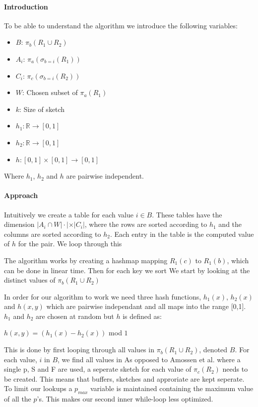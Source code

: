 \documentclass[a4paper,11pt]{article}
\begin{document}
\paragraph{Introduction}
To be able to understand the algorithm we introduce the following variables:

\begin{itemize}
  \item $B$: $\pi_{b}(R_1 \cup R_2)$
  \item $A_i$: $\pi_{a}(\sigma_{b=i}(R_1))$
  \item $C_i$: $\pi_{c}(\sigma_{b=i}(R_2))$
  \item $W$: Chosen subset of $\pi_{a}(R_1)$
  \item $k$: Size of sketch
  \item $h_1 : \mathbb{R} \rightarrow [0,1]$
  \item $h_2 : \mathbb{R} \rightarrow [0,1]$
  \item $h : [0,1] \times [0,1] \rightarrow [0,1]$
\end{itemize}
Where $h_1$, $h_2$ and $h$ are pairwise independent.

\paragraph{Approach}
Intuitively we create a table for each value $i \in B$. These tables have the dimension $|A_i\cap W|\cdot | \times |C_i|$, where the rows are sorted according to $h_1$ and the columns are sorted according to $h_2$. Each entry in the table is the computed value of $h$ for the pair. We loop through this 

The algorithm works by creating a hashmap mapping $R_1(c)$ to $R_1(b)$, which can be done in linear time. Then for each key we sort
We start by looking at the distinct values of $\pi_{b}(R_1 \cup R_2)$

In order for our algorithm to work we need three hash functions, $h_1(x)$, $h_2(x)$ and $h(x,y)$ which are pairwise independant and all maps into the range [0,1]. $h_1$ and $h_2$ are chosen at random but $h$ is defined as:
\begin{center}
$h(x,y) = (h_1(x) - h_2(x))$ mod $1$
\end{center}

This is done by first looping through all values in $\pi_{b}(R_1 \cup R_2)$, denoted $B$. For each value, $i$ in $B$, we find all values in 
As opposed to Amossen et al. where a single p, S and F are used, a seperate sketch for each value of $\pi_c(R_2)$ needs to be created. This means that buffers, sketches and approriate are kept seperate. To limit our lookups a $p_{max}$ variable is maintained containing the maximum value of all the $p$'s. This makes our second inner while-loop less optimized.
\end{document}
